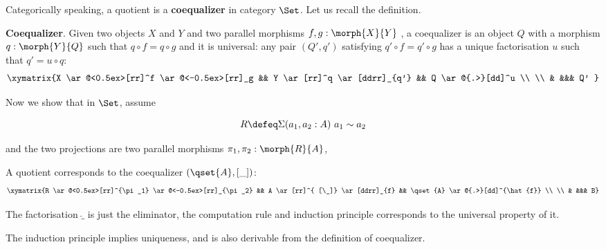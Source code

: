 Categorically speaking, a quotient is a \textbf{coequalizer} in category $\Set$. Let us recall the definition.


\begin{definition}
\textbf{Coequalizer}.
Given two objects $X$ and $Y$ and two parallel morphisms $f, g : \morph{X}{Y}$ , a coequalizer is an object $Q$ with a morphism $q : \morph{Y}{Q}$ such that $q \circ f = q \circ g$ and it is universal: any pair $(Q' , q')$ satisfying $q' \circ f = q' \circ g$ has a unique factorisation $u$ such that $q' = u \circ q$:
\begin{displaymath}
    \xymatrix{X \ar@<0.5ex>[rr]^f \ar@<-0.5ex>[rr]_g && Y \ar[rr]^q
      \ar[ddrr]_{q'} && Q
      \ar@{.>}[dd]^u \\ \\
& &&& Q' }
\end{displaymath}
\end{definition}


Now we show that in $\Set$, assume

$$R \defeq \Sigma (a_1,a_2 : A) ~ a_1 \sim a_2$$


and the two projections are two parallel morphisms $\pi_1,\pi_2 : \morph{R}{A}$,

A quotient corresponds to the coequalizer $(\qset{A},[\_])$:
\begin{displaymath}
    \xymatrix{R \ar@<0.5ex>[rr]^{\pi_1} \ar@<-0.5ex>[rr]_{\pi_2} && A \ar[rr]^{ [\_]}
      \ar[ddrr]_{f} && \qset{A}
      \ar@{.>}[dd]^{\hat{f}} \\ \\
& &&& B}
\end{displaymath}

The factorisation $\hat{\_}$ is just the eliminator, the computation rule and induction principle corresponds to the universal property of it. 

\begin{proposition}
The induction principle implies uniqueness, and is also derivable from the definition of coequalizer.
\end{proposition}

